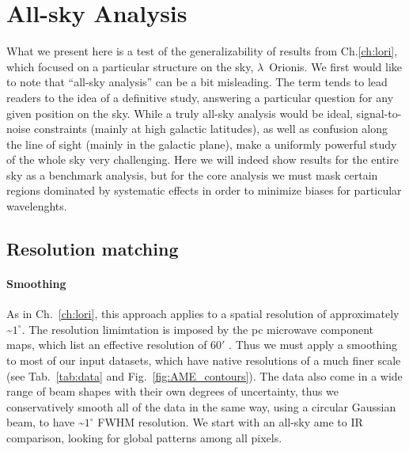 \chapter{All-sky Analysis}
  \label{ch:allsky}
    What we present here is a test of the generalizability of results from Ch.\ref{ch:lori}, which focused on a particular structure on the sky, $\lambda$~Orionis.
    We first would like to note that ``all-sky analysis'' can be a bit misleading. The term tends to lead readers to the idea of a definitive study, answering a particular question for any given position on the sky.  While a truly all-sky analysis would be ideal, signal-to-noise constraints (mainly at high galactic latitudes), as well as confusion along the line of sight (mainly in the galactic plane), make a uniformly powerful study of the whole sky very challenging. Here we will indeed show results for the entire sky as a benchmark analysis, but for the core analysis we must mask certain regions dominated by systematic effects in order to minimize biases for particular wavelenghts.

\section{Resolution matching}
    \subsubsection{Smoothing}
        As in Ch.~\ref{ch:lori}, this approach applies to a spatial resolution of approximately \textasciitilde{}$1^{\circ}$. The resolution limimtation is imposed by the \gls{pc} microwave component maps, which list an effective resolution of 60$'$ \citep{planck15X}. Thus we must apply a smoothing to most of our input datasets, which have native resolutions of a much finer scale (see Tab.~\ref{tab:data} and Fig.~\ref{fig:AME_contours}). The data also come in a wide range of beam shapes with their own degrees of uncertainty, thus we conservatively smooth all of the data in the same way, using a circular Gaussian beam, to have \textasciitilde{}$1^{\circ}$ FWHM resolution. We start with an all-sky \gls{ame} to IR comparison, looking for global patterns among all pixels.


